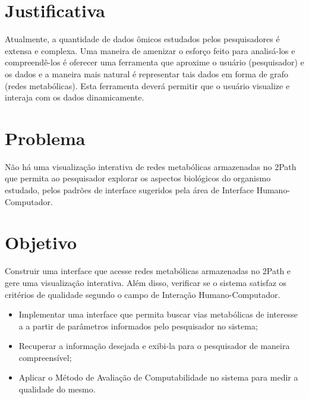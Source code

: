 
\section{Justificativa}
\indent Atualmente, a quantidade de dados ômicos estudados pelos pesquisadores é extensa e complexa. Uma maneira de amenizar o esforço feito para analisá-los e compreendê-los é oferecer uma ferramenta que aproxime o usuário (pesquisador) e os dados e a maneira mais natural é representar tais dados em forma de grafo (redes metabólicas). Esta ferramenta deverá permitir que o usuário visualize e interaja com os dados dinamicamente.

\section{Problema}
\indent Não há uma visualização interativa de redes metabólicas armazenadas no 2Path que permita ao pesquisador explorar os aspectos biológicos do organismo estudado, pelos padrões de interface sugeridos pela área de Interface Humano-Computador.

\section{Objetivo}
\indent Construir uma interface que acesse redes metabólicas armazenadas no 2Path e gere uma visualização interativa. Além disso, verificar se o sistema satisfaz os critérios de qualidade segundo o campo de Interação Humano-Computador.
\begin{itemize}
 \item Implementar uma interface que permita buscar vias metabólicas de interesse a a partir de parâmetros informados pelo pesquisador no sistema;
 \item Recuperar a informação desejada e exibi-la para o pesquisador de maneira compreensível;
 \item Aplicar o Método de Avaliação de Computabilidade no sistema para medir a qualidade do mesmo.
\end{itemize}

